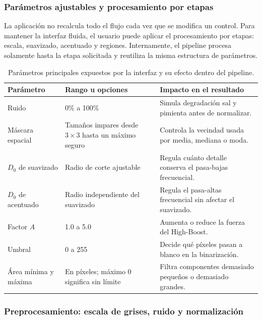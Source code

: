 \documentclass[11pt]{article}
\begin{document}
\subsubsection{Parámetros ajustables y procesamiento por etapas}

La aplicación no recalcula todo el flujo cada vez que se modifica un control. Para mantener la interfaz fluida, el usuario puede aplicar el procesamiento por etapas: escala, suavizado, acentuado y regiones. Internamente, el pipeline procesa solamente hasta la etapa solicitada y reutiliza la misma estructura de parámetros.

\begin{table}[H]
    \centering
    \small
    \renewcommand{\arraystretch}{1.1}
    \begin{tabular}{|p{3.2cm}|p{4.4cm}|p{6.8cm}|}
        \hline
        \textbf{Parámetro} & \textbf{Rango u opciones} & \textbf{Impacto en el resultado} \\
        \hline
        Ruido & 0\% a 100\% & Simula degradación sal y pimienta antes de normalizar. \\
        \hline
        Máscara espacial & Tamaños impares desde $3 \times 3$ hasta un máximo seguro & Controla la vecindad usada por media, mediana o moda. \\
        \hline
        $D_0$ de suavizado & Radio de corte ajustable & Regula cuánto detalle conserva el pasa-bajas frecuencial. \\
        \hline
        $D_0$ de acentuado & Radio independiente del suavizado & Regula el pasa-altas frecuencial sin afectar el suavizado. \\
        \hline
        Factor $A$ & 1.0 a 5.0 & Aumenta o reduce la fuerza del High-Boost. \\
        \hline
        Umbral & 0 a 255 & Decide qué píxeles pasan a blanco en la binarización. \\
        \hline
        Área mínima y máxima & En píxeles; máximo 0 significa sin límite & Filtra componentes demasiado pequeños o demasiado grandes. \\
        \hline
    \end{tabular}
    \caption{Parámetros principales expuestos por la interfaz y su efecto dentro del pipeline.}
    \label{tab:parametros_interfaz}
\end{table}

\subsubsection{Preprocesamiento: escala de grises, ruido y normalización}
\end{document}
